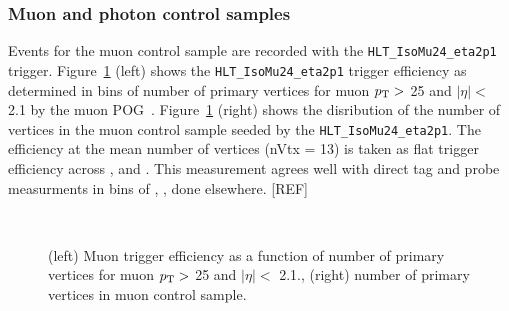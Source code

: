 \subsubsection{Muon and photon control samples\label{sec:muon_triggers}}

Events for the muon control sample are recorded with the \verb!HLT_IsoMu24_eta2p1! 
trigger. Figure~\ref{fig:eff-muon} (left) shows the \verb!HLT_IsoMu24_eta2p1! 
trigger efficiency as determined in bins of number of primary vertices 
for muon $p_{\mathrm{T}} >$ 25 \gev and $|\eta| <$ 2.1 by the muon POG~\cite{ref:muon-eff}.
Figure~\ref{fig:eff-muon} (right) shows the disribution of the number 
of vertices in the muon control sample seeded by the \verb!HLT_IsoMu24_eta2p1!. 
The efficiency at the mean number of vertices (nVtx = 13) is taken as flat
trigger efficiency across \njet, \nb and \scalht. This measurement 
agrees well with direct tag and probe measurments in bins of 
\njet, \nb, \scalht done elsewhere. [REF]

\begin{figure}[!h]
  \begin{center}
  \\     
    \caption{\label{fig:eff-muon}
    (left) Muon trigger efficiency as a function of
    number of primary vertices for muon $p_{\mathrm{T}}>$ 25 \gev and
    $|\eta| <$ 2.1., (right) number of primary vertices
    in muon control sample.} 
 
  \end{center}
\end{figure}

